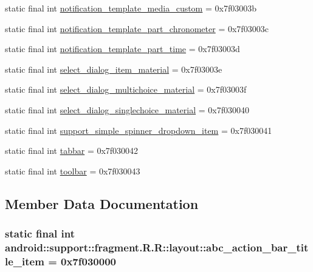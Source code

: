 \begin{CompactItemize}
static final int \hyperlink{classandroid_1_1support_1_1fragment_1_1_r_1_1layout_6ad51768187d3b43c6dae0a54e76c88b}{notification\_\-template\_\-media\_\-custom} = 0x7f03003b
\item 
static final int \hyperlink{classandroid_1_1support_1_1fragment_1_1_r_1_1layout_3dcd7a4010fb702c787c6fe28dc91fd9}{notification\_\-template\_\-part\_\-chronometer} = 0x7f03003c
\item 
static final int \hyperlink{classandroid_1_1support_1_1fragment_1_1_r_1_1layout_9c194498f4f732cce170535a70702603}{notification\_\-template\_\-part\_\-time} = 0x7f03003d
\item 
static final int \hyperlink{classandroid_1_1support_1_1fragment_1_1_r_1_1layout_629422be662037fdad2eac771a9fc3f9}{select\_\-dialog\_\-item\_\-material} = 0x7f03003e
\item 
static final int \hyperlink{classandroid_1_1support_1_1fragment_1_1_r_1_1layout_ec3244043587a5a0321fc550caf286b4}{select\_\-dialog\_\-multichoice\_\-material} = 0x7f03003f
\item 
static final int \hyperlink{classandroid_1_1support_1_1fragment_1_1_r_1_1layout_ea7311246df5bb99ed73782626d2e5b9}{select\_\-dialog\_\-singlechoice\_\-material} = 0x7f030040
\item 
static final int \hyperlink{classandroid_1_1support_1_1fragment_1_1_r_1_1layout_6ca471e9e2eabf8767cad67bfdebcec8}{support\_\-simple\_\-spinner\_\-dropdown\_\-item} = 0x7f030041
\item 
static final int \hyperlink{classandroid_1_1support_1_1fragment_1_1_r_1_1layout_a2f1f1ec2496d1177208afb4c253da19}{tabbar} = 0x7f030042
\item 
static final int \hyperlink{classandroid_1_1support_1_1fragment_1_1_r_1_1layout_98a64594f2e3210cc248eee045c358f2}{toolbar} = 0x7f030043
\end{CompactItemize}


\subsection{Member Data Documentation}
\hypertarget{classandroid_1_1support_1_1fragment_1_1_r_1_1layout_8825a060f410a54627f88e8014f7331f}{
\subsubsection[{abc\_\-action\_\-bar\_\-title\_\-item}]{\setlength{\rightskip}{0pt plus 5cm}static final int android::support::fragment.R.R::layout::abc\_\-action\_\-bar\_\-title\_\-item = 0x7f030000}}
\label{classandroid_1_1support_1_1fragment_1_1_r_1_1layout_8825a060f410a54627f88e8014f7331f}


